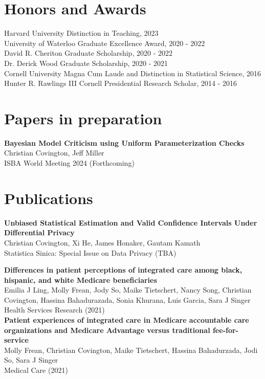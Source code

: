 \documentclass[margin,line]{res}
\begin{document}
\begin{resume}
\section{\sc Honors and Awards} 
Harvard University Distinction in Teaching, 2023 \\
University of Waterloo Graduate Excellence Award, 2020 - 2022 \\
David R. Cheriton Graduate Scholarship, 2020 - 2022 \\
Dr. Derick Wood Graduate Scholarship, 2020 - 2021 \\
Cornell University Magna Cum Laude and Distinction in Statistical Science, 2016 \\
Hunter R. Rawlings III Cornell Presidential Research Scholar, 2014 - 2016

\section{\sc Papers in preparation}

\textbf{Bayesian Model Criticism using Uniform Parameterization Checks} \\
Christian Covington, Jeff Miller \\
ISBA World Meeting 2024 (Forthcoming)

\section{\sc Publications}
\textbf{Unbiased Statistical Estimation and Valid Confidence Intervals Under Differential Privacy} \\
Christian Covington, Xi He, James Honaker, Gautam Kamath \\
Statistica Sinica: Special Issue on Data Privacy (TBA)

\textbf{Differences in patient perceptions of integrated care among black, hispanic, and white Medicare beneficiaries} \\
Emilia J Ling, Molly Frean, Jody So, Maike Tietschert, Nancy Song, Christian Covington, Hassina Bahadurazada, Sonia Khurana, Luis Garcia, Sara J Singer \\ 
Health Services Research (2021) \\

\textbf{Patient experiences of integrated care in Medicare accountable care organizations and Medicare Advantage versus traditional fee-for-service} \\
Molly Frean, Christian Covington, Maike Tietschert, Hassina Bahadurzada, Jodi So, Sara J Singer \\
Medical Care (2021) \\


\end{resume}
\end{document}
